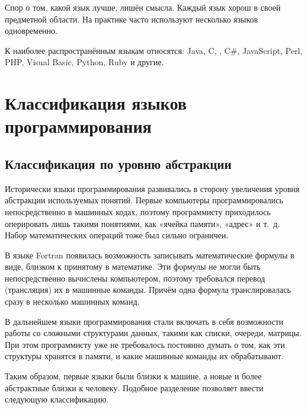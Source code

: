 Спор о том, какой язык лучше, лишён смысла. Каждый язык хорош в своей
предметной области. На практике часто используют несколько языков
одновременно.

К наиболее распространённым языкам относятся: Java, C, \CPP, C\#,
JavaScript, Perl, PHP, Visual Basic, Python, Ruby и другие.

\section{Классификация языков программирования}

\subsection{Классификация по уровню абстракции}

Исторически языки программирования развивались в сторону увеличения
уровня абстракции используемых понятий. Первые компьютеры
программировались непосредственно в машинных кодах, поэтому
программисту приходилось оперировать лишь такими понятиями, как
«ячейка памяти», «адрес» и т.~д. Набор математических операций тоже
был сильно ограничен.

В языке Fortran появилась возможность записывать математические
формулы в виде, близком к принятому в математике. Эти формулы не могли
быть непосредственно вычислены компьютером, поэтому требовался перевод
(трансляция) их в машинные команды. Причём одна формула
транслировалась сразу в несколько машинных команд.

В дальнейшем языки программирования стали включать в себя возможности
работы со сложными структурами данных, такими как списки, очереди,
матрицы. При этом программисту уже не требовалось постоянно думать о
том, как эти структуры хранятся в памяти, и какие машинные команды их
обрабатывают.

Таким образом, первые языки были близки к машине, а новые и более
абстрактные близки к человеку. Подобное разделение позволяет ввести
следующую классификацию.


